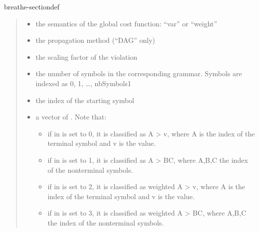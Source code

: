 \documentclass[letterpaper,10pt,openany,oneside,english]{sphinxmanual}
\begin{document}
\begin{fulllineitems}
\begin{sphinxuseclass}{breathe-sectiondef}
\begin{fulllineitems}
\begin{quote}
\begin{description}
\begin{itemize}
\item {} 
\sphinxAtStartPar
{} \textendash{} the semantics of the global cost function: “var” or “weight” 

\item {} 
\sphinxAtStartPar
{} \textendash{} the propagation method (“DAG” only) 

\item {} 
\sphinxAtStartPar
{} \textendash{} the scaling factor of the violation 

\item {} 
\sphinxAtStartPar
{} \textendash{} the number of symbols in the corresponding grammar. Symbols are indexed as 0, 1, …, nbSymbols\sphinxhyphen{}1 

\item {} 
\sphinxAtStartPar
{} \textendash{} the index of the starting symbol 

\item {} 
\sphinxAtStartPar
{} \textendash{} a vector of . Note that:\begin{itemize}
\item {} 
\sphinxAtStartPar
if  in  is set to 0, it is classified as A \sphinxhyphen{}\textgreater{} v, where A is the index of the terminal symbol and v is the value.

\item {} 
\sphinxAtStartPar
if  in  is set to 1, it is classified as A \sphinxhyphen{}\textgreater{} BC, where A,B,C the index of the nonterminal symbols.

\item {} 
\sphinxAtStartPar
if  in  is set to 2, it is classified as weighted A \sphinxhyphen{}\textgreater{} v, where A is the index of the terminal symbol and v is the value.

\item {} 
\sphinxAtStartPar
if  in  is set to 3, it is classified as weighted A \sphinxhyphen{}\textgreater{} BC, where A,B,C the index of the nonterminal symbols.


\end{itemize}
\end{itemize}
\end{description}
\end{quote}
\end{fulllineitems}
\end{sphinxuseclass}
\end{fulllineitems}
\end{document}
